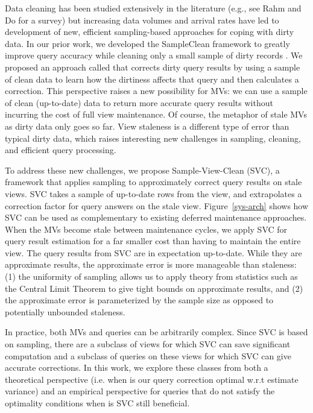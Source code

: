 Data cleaning has been studied extensively in the literature (e.g., see Rahm and Do for a survey\cite{rahm2000data}) but increasing data volumes and arrival rates have led to development of new, efficient sampling-based approaches for coping with dirty data.   
In our prior work, we developed the SampleClean framework to greatly improve query accuracy while cleaning only a small sample of dirty records \cite{wang1999sample}.  
We proposed an approach called \nsc that corrects dirty query results by using a sample of clean data to learn how the dirtiness affects that query and then calculates a correction.  
This perspective raises a new possibility for MVs: we can use a sample of clean (up-to-date) data to return more accurate query results without incurring the cost of full view maintenance.
Of course, the metaphor of stale MVs as dirty data only goes so far. 
View staleness is a different type of error than typical dirty data, which raises interesting new challenges in sampling, cleaning, and efficient query processing.

To address these new challenges, we propose Sample-View-Clean (SVC), a framework that applies sampling to approximately correct query results on stale views.
SVC takes a sample of up-to-date rows from the view, and extrapolates a correction factor for query answers on the stale view. Figure~\ref{sys-arch} shows how SVC can be used as complementary to existing deferred maintenance approaches. When the MVs become stale between maintenance cycles, we apply SVC for query result estimation for a far smaller cost than having to maintain the entire view.
The query results from SVC are in expectation up-to-date. While they are approximate results, the approximate error is more manageable than staleness: (1) the uniformity of sampling allows us to apply theory from statistics such as the Central Limit Theorem to give tight bounds on approximate results, and (2) the approximate error is parameterized by the sample size as opposed to potentially unbounded staleness.

In practice, both MVs and queries can be arbitrarily complex.
Since SVC is based on sampling, there are a subclass of views for which SVC can save significant computation and a subclass of queries on these views for which SVC can give accurate corrections.
In this work, we explore these classes from both a theoretical perspective (i.e. when is our query correction optimal w.r.t estimate variance) and an empirical perspective for queries that do not satisfy the optimality conditions when is SVC still beneficial.




